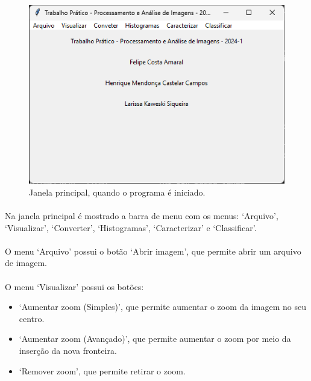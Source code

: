 \documentclass[12pt]{article}
\begin{document}
\begin{figure}
    \centering
    \includegraphics{Captura de tela 2024-06-10 094756.png}
    \caption{Janela principal, quando o programa é iniciado.}
    \label{fig:janela-principal}
\end{figure}

\paragraph{}Na janela principal é mostrado a barra de menu com os menus: ‘Arquivo’, ‘Visualizar’, ‘Converter’, ‘Histogramas’, ‘Caracterizar’ e ‘Classificar’.

\paragraph{}O menu ‘Arquivo’ possui o botão ‘Abrir imagem’, que permite abrir um arquivo de imagem.

\paragraph{}O menu ‘Visualizar’ possui os botões:

\begin{itemize}
    \item ‘Aumentar zoom (Simples)’, que permite aumentar o zoom da imagem no seu centro.

    \item ‘Aumentar zoom (Avançado)’, que permite aumentar o zoom por meio da inserção da nova fronteira.

    \item ‘Remover zoom’, que permite retirar o zoom.
\end{itemize}
\end{document}
